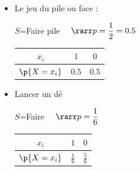 \begin{ex}
	\nline
	\begin{itemize}
		\item Le jeu du pile ou face :

		      $S$=\og Faire pile\fg{} $\quad\rarr p=\dfrac{1}{2}=0.5$
		      \begin{center}
			      \begin{tabular}{|c|c|c|} \hline
				      \ccg $x_i$       & $1$   & $0$   \\ \hline
				      \ccg $\p{X=x_i}$ & $0.5$ & $0.5$ \\ \hline
			      \end{tabular}
		      \end{center}

		\item Lancer un dé

		      $S$=\og Faire \fg{} $\quad\rarr p=\dfrac{1}{6}$
		      \begin{center}
			      \begin{tabular}{|c|c|c|} \hline
				      \ccg $x_i$       & $1$           & $0$           \\ \hline
				      \ccg $\p{X=x_i}$ & $\frac{1}{6}$ & $\frac{5}{6}$ \\ \hline
			      \end{tabular}
		      \end{center}
	\end{itemize}

\end{ex}

